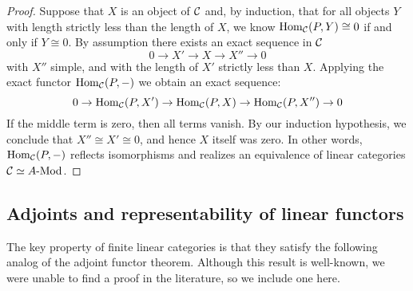\documentclass{amsart}
\begin{document}
\begin{proof}
Suppose that $X$ is an object of $\mathcal C$ and, by induction, that for all objects $Y$ with length strictly less than the length of $X$, we know $\operatorname{Hom}_{\mathcal C}(P,Y) \cong 0$ if and only if $Y \cong 0$. By assumption there exists an exact sequence in $\mathcal C$
\begin{equation*}
	0 \to X' \to X \to X'' \to 0
\end{equation*}
with $X''$ simple, and with the length of $X'$ strictly less than $X$. Applying the exact functor $\operatorname{Hom}_{\mathcal C}(P,-)$ we obtain an exact sequence:
\begin{equation*}
	0 \to \operatorname{Hom}_{\mathcal C}(P,X') \to \operatorname{Hom}_{\mathcal C}(P,X) \to \operatorname{Hom}_{\mathcal C}(P,X'') \to 0
\end{equation*}
If the middle term is zero, then all terms vanish. By our induction hypothesis, we conclude that $X'' \cong X' \cong 0$, and hence $X$ itself was zero. In other words, $\operatorname{Hom}_{\mathcal C}(P,-)$ reflects isomorphisms and realizes an equivalence of linear categories $\cC \simeq \Mod{A}{}$.
\end{proof}

\subsection{Adjoints and representability of linear functors}

The key property of finite linear categories is that they satisfy the following analog of the adjoint functor theorem.  Although this result is well-known, we were unable to find a proof in the literature, so we include one here.  
\end{document}
